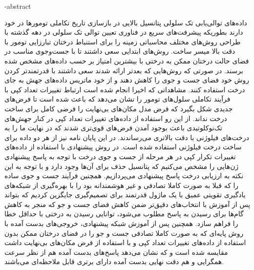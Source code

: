 \fa-abstract{
	
	داده‌های توالی‌یابی تک سلولی پتانسیل بالایی در بازسازی تاریخ تکاملی تومورها در خود دارند بطوریکه پیشرفت‌های سریع در فناوری تعیین توالی تک سلولی در دهه گذشته با طراحی روش‌های مختلف محاسباتی زمینه را برای استنباط درختان تبارزایی تومور با دقت بالا میسر ساخت. روش‌های ابتدایی سعی داشتند تا با جست‌وجوی مناسب در فضای حالت درختان ممکن به درختی با بیشترین امتیاز بر حسب داده‌های مشخص شده برسند. در صورتی که روش‌هایی که بعدتر ارائه شدند سعی داشتند با قدرتمندتر کردن روش خود فضای جست و جوی را کاهش دهند و از خود ماتریس داده‌های جهش به جای درخت استفاده کنند. مشاهداتی که اخیرا انجام شده است ارتباط تغییرات تعداد کپی با فرآیند تکاملی سلول‌های تومور را نشان می‌دهد که باعث شده است تا فرض‌های جدیدی شکل بگیرد که فرض مدل مکان‌های بی‌نهایت را فرضی کامل برای ساخت درخت نداند. از این رو استفاده از داده‌های تغییرات تعداد کپی در کنار جهش‌های تک‌نوکلوتیدی باعث بوجود آمدن فرض‌های قوی‌تری شدند که در نهایت ما را به درخت‌های فیلوژنی با دقت بالاتری می‌رساندند. در این پایان نامه نیز از هر دو داده برای ساخت درخت فیلوژنی استفاده شده است. 
در روش پیشنهادی با استفاده از داده‌های تغییرات تکرار کپی در هر مرحله از جست و جوی درخت با توجه به پاسخ پیشنهادی ژن‌هایی را مشخص می‌کنیم که پتانسیل حذف برای آن‌ها وجود دارد و با توجه به این نکته به ارزیابی درخت پاسخ پیشنهادی می‌پردازیم. همچنین فرآیند جست و جوی ساده را که قبلا به صورت کاملا تصادفی و غیر هوشمندانه بود را با بهره‌گیری از شبکه‌های یادگیری تقویتی عمیق با یک ماژول قدرتمند برای تصمیم‌گیری جایگزین کردیم که بتواند پس از آموزش با انتخاب‌های دقیق‌تر ضمن کاهش فضای جست و جو که منجر به کاهش گام‌ها برای رسیدن به پاسخ مطلوب می‌شود، توانایی رسیدن به درختی با حداقل خطا را فراهم سازد. همچنین پس از آموزش شبکه پیشنهادی، خروجی‌های بدست آمده با روش پایه‌ای که به صورت کاملا تصادفی جست و جو را در فضای درختان ممکن بدون استفاده از داد‌ه‌های تغییرات تعداد کپی و با استفاده از فرض مکان‌های بی‌نهایت داشت مقایسه شده است و که نشان می‌دهد پاسخ‌های بدست آمده هم از نظر سرعت همگرایی و هم دقت نهایی بدست آمده دارای برتری قابل ملاحظه‌ای می‌باشند. 
	
}

